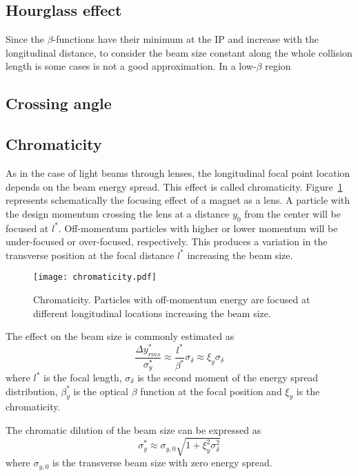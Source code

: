 \subsection{Hourglass effect}
Since the $\beta$-functions have their minimum at the IP and increase with the longitudinal distance, to consider the beam size constant along the whole collision length is some cases is not a good approximation. In a low-$\beta$ region 
\subsection{Crossing angle}
\subsection{Chromaticity}
As in the case of light beams through lenses, the longitudinal focal point location depends on the beam energy spread. This effect is called chromaticity.  Figure~\ref{f:chrom} represents schematically the focusing effect of a magnet as a lens. A particle with the design momentum crossing the lens at a distance $y_0$ from the center will be focused at $l^*$. Off-momentum particles with higher or lower momentum will be under-focused or over-focused, respectively. This produces a variation in the transverse position at the focal distance $l^*$ increasing the beam size.\par
\begin{figure}[!hbt]
\centering
\texttt{[image: chromaticity.pdf]}\caption{Chromaticity. Particles with off-momentum energy are focused at different longitudinal locations increasing the beam size.}\label{f:chrom}
\end{figure}
The effect on the beam size is commonly estimated as
\begin{equation}
 \frac{\Delta y^*_{rms}}{\sigma^*_y}\approx\frac{l^*}{\beta^*}\sigma_\delta\approx\xi_y\sigma_\delta
\end{equation}
where $l^*$ is the focal length, $\sigma_\delta$ is the second moment of the energy spread distribution, $\beta_y^*$ is the optical $\beta$ function at the focal position and $\xi_y$ is the chromaticity.\par
The chromatic dilution of the beam size can be expressed as 
\begin{equation}
 \sigma^*_y\approx\sigma_{y,0}\sqrt{1+\xi_y^2\sigma^2_\delta}
\end{equation}
where $\sigma_{y,0}$ is the transverse beam size with zero energy spread.\par
